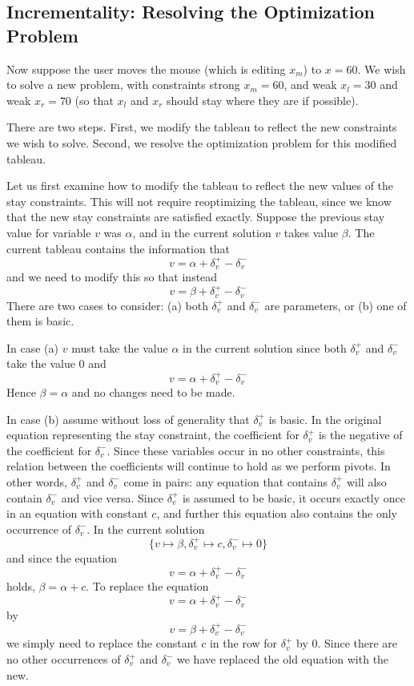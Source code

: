 \documentclass{article}
\newcommand{\strength}{\sf}
\begin{document}
\subsection{Incrementality: Resolving the Optimization Problem}
\label{resolving}

Now suppose the user moves the mouse (which
is editing $x_m$) to $x=60$.
We wish to solve a new problem, with
constraints {\strength strong} $x_m = 60$, and
{\strength weak} $x_l = 30$ and {\strength weak} $x_r = 70$
(so that $x_l$ and $x_r$ should stay where they are if possible).


There are two steps.  First, we modify the tableau to reflect the new
constraints we wish to solve.  Second, we resolve the optimization problem
for this modified tableau.

Let us first examine how to modify the tableau to reflect the new values of
the stay constraints.  This will not require reoptimizing the tableau,
since we know that the new stay constraints are satisfied exactly.
Suppose the previous stay value for variable $v$ was $\alpha$, and in the
current solution $v$ takes value $\beta$.  The current tableau contains the
information that 
$$v = \alpha + \delta_v^+ - \delta_v^-$$
and we need to
modify this so that instead 
$$v = \beta + \delta_v^+ - \delta_v^-$$
There
are two cases to consider: (a) both $\delta_v^+$ and $\delta_v^-$ are
parameters, or (b) one of them is basic.

In case (a) $v$ must take the value $\alpha$
in the current solution since both $\delta_v^+$ and 
$\delta_v^-$ take the value $0$ and 
$$v = \alpha + \delta_v^+ - \delta_v^-$$
Hence $\beta = \alpha$ and no changes need to be made.

In case (b) assume without loss of generality that $\delta_v^+$ is
basic.  In the original equation representing the stay constraint, the
coefficient for $\delta_v^+$ is the negative of the coefficient for
$\delta_v^-$.  Since these variables occur in no other constraints, this
relation between the coefficients will continue to hold as we perform
pivots.  In other words, $\delta_v^+$ and $\delta_v^-$ come in pairs: any
equation that contains $\delta_v^+$ will also contain $\delta_v^-$ and vice
versa.  Since $\delta_v^+$ is assumed to be basic, it occurs exactly once
in an equation with constant $c$, and further this equation also contains
the only occurrence of $\delta_v^-$.  In the current solution 
$$\{v \mapsto \beta, \delta_v^+ \mapsto c, \delta_v^- \mapsto 0\}$$
and since the
equation 
$$v = \alpha + \delta_v^+ - \delta_v^-$$
holds, $\beta = \alpha + c$.  To replace the equation 
$$v = \alpha + \delta_v^+ - \delta_v^-$$
by  
$$v = \beta + \delta_v^+ - \delta_v^-$$
we simply need to replace the constant $c$
in the row for $\delta_v^+$ by $0$.  Since there are no other 
occurrences of $\delta_v^+$
and $\delta_v^-$ we have replaced the old equation with the new.
\end{document}
